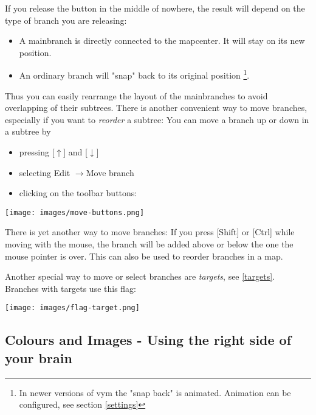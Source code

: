\documentclass[12pt,a4paper]{article}
\newcommand{\ra}{$\longrightarrow$}
\newcommand{\ua}{$\uparrow$}
\newcommand{\da}{$\downarrow$}
\newcommand{\key}[1]{[#1]}
\begin{document}
If you release the button in the middle of nowhere, the result will
depend on the type of branch you are releasing:
\begin{itemize}
    \item A mainbranch is directly connected to the mapcenter.
        It will stay on its new position.
    \item An ordinary branch will "snap" back to its original position
    \footnote{In newer versions of vym the "snap back" is animated.
    Animation can be configured, see section \ref{settings}}. 
\end{itemize}
Thus you can easily rearrange the layout of the mainbranches to avoid
overlapping of their subtrees.  There is another convenient way to move
branches, especially if you want to {\em reorder} a subtree: You can
move a branch up or down in a subtree by
\begin{itemize}
    \item pressing \key{\ua} and \key {\da}
    \item selecting Edit \ra Move branch
    \item clicking on the toolbar buttons:
\end{itemize}
        \begin{center}
            \texttt{[image: images/move-buttons.png]}
        \end{center}    
There is yet another way to move branches: If you press \key{Shift} or
\key{Ctrl} while moving with the mouse, the branch will be added above
or below the one the mouse pointer is over. This can also be used to
reorder branches in a map.

Another special way to move or select branches are {\em targets}, see
\ref{targets}. Branches with targets use this flag:
\begin{center}
    \texttt{[image: images/flag-target.png]}
    \label{propwindow}
\end{center}


\subsection{Colours and Images - Using the right side of your brain}
\end{document}
